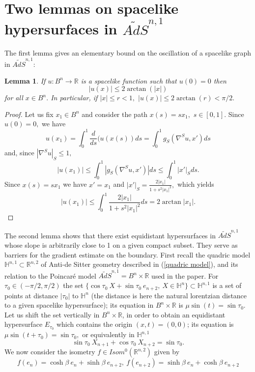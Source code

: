\documentclass[10pt,reqno,oneside]{amsart}
\newtheorem{lem}{Lemma}[section]
\theoremstyle{definition}
\theoremstyle{remark}
\newcommand{\R}{\mathbb{R}}
\begin{document}
\section{Two lemmas on spacelike hypersurfaces in $\widetilde{AdS}^{n,1}$}\label{appendix equidistant}
The first lemma gives an elementary bound on the oscillation of a spacelike graph in $\widetilde{AdS}^{n,1}$:
\begin{lem}\label{app lem estim u}
If $u:B^n\rightarrow\R$ is a spacelike function such that $u(0)=0$ then
\begin{equation}\label{app equidistant lem estim u}
|u(x)|\leq 2\arctan(|x|)
\end{equation}
 for all $x\in B^n.$ In particular, if $|x|\leq r<1,$ $|u(x)|\leq 2\arctan(r)<\pi/2.$
\end{lem}
\begin{proof}
Let us fix $x_1\in B^n$ and consider the path $x(s)=sx_1,$ $s\in[0,1].$
Since $u(0)=0,$ we have
$$u(x_1)=\int_0^1\frac{d}{ds}(u(x(s))ds=\int_0^1g_S\left(\nabla^Su,x'\right)ds$$
and, since $|\nabla^Su|_S\leq 1,$
$$|u(x_1)|\leq\int_0^1\left|g_S\left(\nabla^Su,x'\right)\right|ds\leq \int_0^1|x'|_Sds.$$
Since $x(s)=sx_1$ we have $x'=x_1$ and $|x'|_S=\frac{2|x_1|}{1+s^2|x_1|^2},$ which yields
$$|u(x_1)|\leq \int_0^1\frac{2|x_1|}{1+s^2|x_1|^2}ds=2\arctan|x_1|.$$
\end{proof}
The second lemma shows that there exist equidistant hypersurfaces in $\widetilde{AdS}^{n,1}$ whose slope is arbitrarily close to 1 on a given compact subset. They serve as barriers for the gradient estimate on the boundary. First recall the quadric model $\mathbb{H}^{n,1}\subset\R^{n,2}$ of Anti-de Sitter geometry described in (\ref{quadric model}), and its relation to the Poincar\'e model $\widetilde{AdS}^{n,1}=B^n\times\R$ used in the paper. For $\tau_0\in (-\pi/2,\pi/2)$ the set $\{\cos\tau_0\ X+\sin\tau_0\ e_{n+2},\ X\in\mathbb{H}^{n}\}\subset\mathbb{H}^{n,1}$ is a set of points at distance $|\tau_0|$ to $\mathbb{H}^{n}$ (the distance is here the natural lorentzian distance to a given spacelike hypersurface); its equation in $B^n\times\R$ is $\mu\sin(t)=\sin\tau_0.$ Let us shift the set vertically in $B^n\times\R$, in order to obtain an equidistant hypersurface $E_{\tau_0}$ which contains the origin $(x,t)=(0,0)$; its equation is $\mu\sin(t+\tau_0)=\sin\tau_0,$ or equivalently in $\mathbb{H}^{n,1}$ 
$$\sin\tau_0\ X_{n+1}+\cos\tau_0\ X_{n+2}=\sin\tau_0.$$
We now consider the isometry $f\in Isom^0(\R^{n,2})$ given by
$$f(e_n)=\cosh\beta\ e_n+\sinh\beta\ e_{n+2},\  f(e_{n+2})=\sinh\beta\ e_n+\cosh\beta\ e_{n+2}$$
\end{document}
